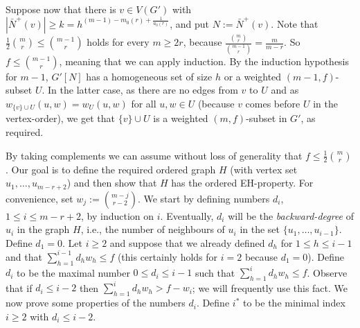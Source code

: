 \documentclass[11pt]{article}
\let\oldendproof\endproof
\renewenvironment{proof}[1][\proofname]{%
	\oldproof[\bf #1]%
}{\oldendproof}
\theoremstyle{plain}
\begin{document}
\begin{proof} [Proof of Lemma \ref{r-graphs induction}]
    Suppose now that there is $v \in V(G')$ with $|\bar{N}^+(v)| \geq k = h^{(m-1) - m_0(r) + \frac{1}{a_0(r)}}$, and put $N := \bar{N}^+(v)$.
    Note that $\frac{1}{2} \binom{m}{r} \leq \binom{m-1}{r}$ holds for every $m \geq 2r$, because $\frac{\binom{m}{r}}{\binom{m-1}{r}} = \frac{m}{m-r}$.
    So $f \leq \binom{m-1}{r}$, meaning that we can apply induction. 
    By the induction hypothesis for $m-1$, $G'[N]$ has a homogeneous set of size $h$ or a weighted 
    $(m-1,f)$-subset $U$. In the latter case, as there are no edges from $v$ to $U$ and 
    as $w_{\{v\} \cup U}(u,w) = w_U(u,w)$ for all $u,w \in U$ (because $v$ comes before $U$ in the vertex-order), we get that $\{v\} \cup U$ is a weighted $(m,f)$-subset in $G'$, as \nolinebreak required.
\end{proof}


\begin{proof}[Proof of Lemma \ref{r-graphs induction base case}]
    By taking complements we can assume without loss of generality that 
    $f \leq \frac{1}{2}\binom{m}{r}$. 
    Our goal is to define the required ordered graph $H$ (with vertex set $u_1,\dots,u_{m-r+2}$) and then show that $H$ has the ordered EH-property. 
    For convenience, set $w_j := \binom{m-j}{r-2}$. 
    We start by defining numbers $d_i$, $1 \leq i \leq m-r+2$, by induction on $i$. Eventually, $d_i$ will be the {\em backward-degree} of $u_i$ in the graph $H$, i.e., the number of neighbours of $u_i$ in the set $\{u_1,\dots,u_{i-1}\}$. Define $d_1 = 0$. Let $i \geq 2$ and suppose that we already defined $d_h$ for $1 \leq h \leq i-1$ and that $\sum_{h=1}^{i-1} d_h w_h \leq f$ (this certainly holds for $i=2$ because $d_1=0$). Define $d_i$ to be the maximal number $0 \leq d_i \leq i-1$ such that $\sum_{h=1}^i d_h w_h \leq f$. 
    Observe that if $d_i \leq i-2$ then $\sum_{h=1}^i d_h w_h > f - w_i$; we will frequently use this fact. We now prove some properties of the numbers $d_i$.   
    Define $i^*$ to be the minimal index $i \geq 2$ with $d_{i} \leq i-2$. 

    


\end{proof}
\end{document}
